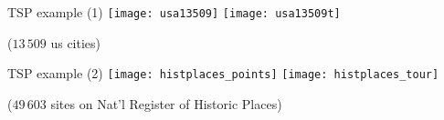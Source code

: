 \begin{frame}{TSP example (1)}
    \texttt{[image: usa13509]}
    \texttt{[image: usa13509t]}

    ($13\,509$ us cities)
\end{frame}

\begin{frame}{TSP example (2)}
    \texttt{[image: histplaces\_points]}
    \texttt{[image: histplaces\_tour]}
    
    ($49\,603$ sites on Nat'l Register of Historic Places)
\end{frame}
